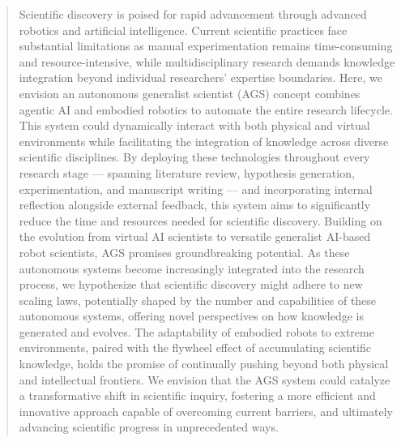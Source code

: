 \begin{abstract}


Scientific discovery is poised for rapid advancement through advanced robotics and artificial intelligence. Current scientific practices face substantial limitations as manual experimentation remains time-consuming and resource-intensive, while multidisciplinary research demands knowledge integration beyond individual researchers' expertise boundaries. Here, we envision an autonomous generalist scientist (AGS) concept combines agentic AI and embodied robotics to automate the entire research lifecycle. This system could dynamically interact with both physical and virtual environments while facilitating the integration of knowledge across diverse scientific disciplines. By deploying these technologies throughout every research stage --- spanning literature review, hypothesis generation, experimentation, and manuscript writing --- and incorporating internal reflection alongside external feedback, this system aims to significantly reduce the time and resources needed for scientific discovery. Building on the evolution from virtual AI scientists to versatile generalist AI-based robot scientists, AGS promises groundbreaking potential. As these autonomous systems become increasingly integrated into the research process, we hypothesize that scientific discovery might adhere to new scaling laws, potentially shaped by the number and capabilities of these autonomous systems, offering novel perspectives on how knowledge is generated and evolves. The adaptability of embodied robots to extreme environments, paired with the flywheel effect of accumulating scientific knowledge, holds the promise of continually pushing beyond both physical and intellectual frontiers. We envision that the AGS system could catalyze a transformative shift in scientific inquiry, fostering a more efficient and innovative approach capable of overcoming current barriers, and ultimately advancing scientific progress in unprecedented ways.



\end{abstract}